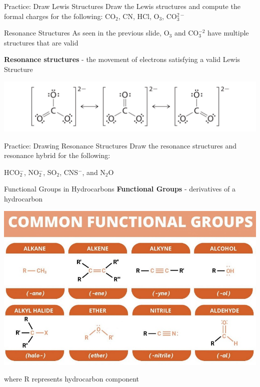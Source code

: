 \documentclass[11pt]{beamer}
\begin{document}
\begin{frame}{Practice: Draw Lewis Structures}
  Draw the Lewis structures and compute the formal charges for the
  following: CO$_2$, CN, HCl, O$_3$, CO$_3^{2-}$
  \vspace{1.75in}
\end{frame}

\begin{frame}{Resonance Structures}
  As seen in the previous slide, O$_3$ and CO$_3^{-2}$ have multiple
  structures that are valid

  \textbf{Resonance structures} - the movement of electrons satisfying
  a valid Lewis Structure
  
  \centering
  \includegraphics[width=1\linewidth]{resonance_struct}
\end{frame}

\begin{frame}{Practice: Drawing Resonance Structures}
  Draw the resonance structures and resonance hybrid for the following:

  HCO$_2^{-}$, NO$_2^-$, SO$_2$, CNS$^-$, and N$_2$O
  \vspace{1.75in}
\end{frame}

\begin{frame}{Functional Groups in Hydrocarbons}
  \textbf{Functional Groups} - derivatives of a hydrocarbon
  \begin{center}
    \includegraphics[width=0.8\linewidth]{func_groups}
  \end{center}
  where R represents hydrocarbon component
\end{frame}
\end{document}
